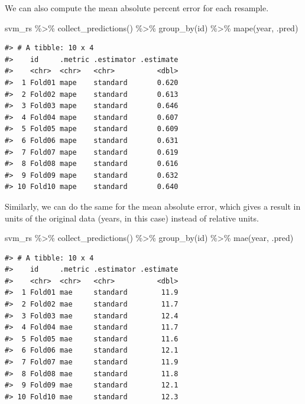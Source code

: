 \documentclass[
]{krantz}
\makeatletter
\newenvironment{Shaded}{\begin{snugshade}}{\end{snugshade}}
\newcommand{\FunctionTok}[1]{\textcolor[rgb]{0.00,0.00,0.00}{#1}}
\newcommand{\NormalTok}[1]{#1}
\newcommand{\SpecialCharTok}[1]{\textcolor[rgb]{0.00,0.00,0.00}{#1}}
\newenvironment{kframe}{%
\medskip{}
\setlength{\fboxsep}{.8em}
 \def\at@end@of@kframe{}%
 \ifinner\ifhmode%
  \def\at@end@of@kframe{\end{minipage}}%
  \begin{minipage}{\columnwidth}%
 \fi\fi%
 \def\FrameCommand##1{\hskip\@totalleftmargin \hskip-\fboxsep
 \colorbox{shadecolor}{##1}\hskip-\fboxsep
     \hskip-\linewidth \hskip-\@totalleftmargin \hskip\columnwidth}%
 \MakeFramed {\advance\hsize-\width
   \@totalleftmargin\z@ \linewidth\hsize
   \@setminipage}}%
 {\par\unskip\endMakeFramed%
 \at@end@of@kframe}
\renewenvironment{Shaded}{\begin{kframe}}{\end{kframe}}
\makeatother
\begin{document}
We can also compute the mean absolute percent error for each resample.

\begin{Shaded}
\begin{Highlighting}[]
\NormalTok{svm\_rs }\SpecialCharTok{\%\textgreater{}\%}
  \FunctionTok{collect\_predictions}\NormalTok{() }\SpecialCharTok{\%\textgreater{}\%}
  \FunctionTok{group\_by}\NormalTok{(id) }\SpecialCharTok{\%\textgreater{}\%}
  \FunctionTok{mape}\NormalTok{(year, .pred)}
\end{Highlighting}
\end{Shaded}

\begin{verbatim}
#> # A tibble: 10 x 4
#>    id     .metric .estimator .estimate
#>    <chr>  <chr>   <chr>          <dbl>
#>  1 Fold01 mape    standard       0.620
#>  2 Fold02 mape    standard       0.613
#>  3 Fold03 mape    standard       0.646
#>  4 Fold04 mape    standard       0.607
#>  5 Fold05 mape    standard       0.609
#>  6 Fold06 mape    standard       0.631
#>  7 Fold07 mape    standard       0.619
#>  8 Fold08 mape    standard       0.616
#>  9 Fold09 mape    standard       0.632
#> 10 Fold10 mape    standard       0.640
\end{verbatim}

Similarly, we can do the same for the mean absolute error, which gives a result in units of the original data (years, in this case) instead of relative units.

\begin{Shaded}
\begin{Highlighting}[]
\NormalTok{svm\_rs }\SpecialCharTok{\%\textgreater{}\%}
  \FunctionTok{collect\_predictions}\NormalTok{() }\SpecialCharTok{\%\textgreater{}\%}
  \FunctionTok{group\_by}\NormalTok{(id) }\SpecialCharTok{\%\textgreater{}\%}
  \FunctionTok{mae}\NormalTok{(year, .pred)}
\end{Highlighting}
\end{Shaded}

\begin{verbatim}
#> # A tibble: 10 x 4
#>    id     .metric .estimator .estimate
#>    <chr>  <chr>   <chr>          <dbl>
#>  1 Fold01 mae     standard        11.9
#>  2 Fold02 mae     standard        11.7
#>  3 Fold03 mae     standard        12.4
#>  4 Fold04 mae     standard        11.7
#>  5 Fold05 mae     standard        11.6
#>  6 Fold06 mae     standard        12.1
#>  7 Fold07 mae     standard        11.9
#>  8 Fold08 mae     standard        11.8
#>  9 Fold09 mae     standard        12.1
#> 10 Fold10 mae     standard        12.3
\end{verbatim}
\end{document}
